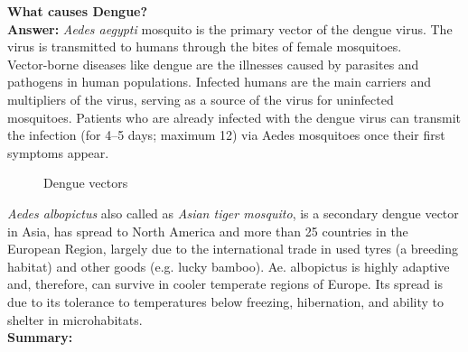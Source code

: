 \documentclass[11pt]{exam}
\begin{document}
\begin{questions}
\question
\label{3. Dengue cause }
\textbf{What causes Dengue?}\\
\textbf{Answer:}
\textit{Aedes aegypti} mosquito is the primary vector of the dengue virus. The virus is transmitted to humans through the bites of female mosquitoes. \\
Vector-borne diseases like dengue are the illnesses caused by parasites and pathogens in human populations. Infected humans are the main carriers and multipliers of the virus, serving as a source of the virus for uninfected mosquitoes. Patients who are already infected with the dengue virus can transmit the infection (for 4–5 days; maximum 12) via Aedes mosquitoes once their first symptoms appear. \\ 
\begin{figure}[H]
  \centering
  \hfill
  \caption{Dengue vectors}
  \label{Dengue vectors }
\end{figure} 

\textit{Aedes albopictus} also called as \textit{Asian tiger mosquito}, is a secondary dengue vector in Asia, has spread to North America and more than 25 countries in the European Region, largely due to the international trade in used tyres (a breeding habitat) and other goods (e.g. lucky bamboo). Ae. albopictus is highly adaptive and, therefore, can survive in cooler temperate regions of Europe. Its spread is due to its tolerance to temperatures below freezing, hibernation, and ability to shelter in microhabitats.\\

\textbf{Summary:} \\
\\ \\


\end{questions}
\end{document}
